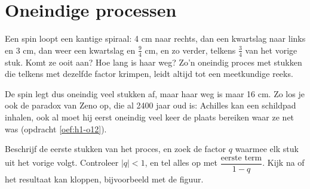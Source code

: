 \begin{oefeningen}
\end{oefeningen}

\section{Oneindige processen}

Een spin loopt een kantige spiraal: 4 cm naar rechts, dan een kwartslag naar links en 3 cm, dan weer een kwartslag en $\tfrac94$ cm, en zo verder, telkens $\tfrac34$ van het vorige stuk. Komt ze ooit aan? Hoe lang is haar weg? Zo'n oneindig proces met stukken die telkens met dezelfde factor krimpen, leidt altijd tot een meetkundige reeks.


De spin legt dus oneindig veel stukken af, maar haar weg is maar 16 cm. Zo los je ook de paradox van Zeno op, die al 2400 jaar oud is: Achilles kan een schildpad inhalen, ook al moet hij eerst oneindig veel keer de plaats bereiken waar ze net was (opdracht \ref{oef:h1-o12}).

\begin{werkwijze}
Beschrijf de eerste stukken van het proces, en zoek de factor $q$ waarmee elk stuk uit het vorige volgt. Controleer $|q| < 1$, en tel alles op met $\dfrac{\text{eerste term}}{1 - q}$. Kijk na of het resultaat kan kloppen, bijvoorbeeld met de figuur.
\end{werkwijze}

